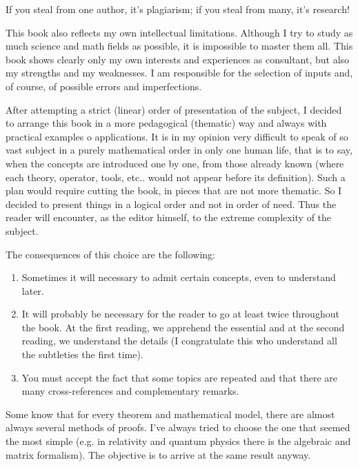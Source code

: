 	\begin{fquote}If you steal from one author, it's plagiarism; if you steal from many, it's research!
 	\end{fquote}

	This book also reflects my own intellectual limitations. Although I try to study as much science and math fields as possible, it is impossible to master them all. This book shows clearly only my own interests and experiences as consultant, but also my strengths and my weaknesses. I am responsible for the selection of inputs and, of course, of possible errors and imperfections.

	After attempting a strict (linear) order of presentation of the subject, I decided to arrange this book in a more pedagogical (thematic) way and always with practical examples o applications. It is in my opinion very difficult to speak of so vast subject in a purely mathematical order in only one human life, that is to say, when the concepts are introduced one by one, from those already known (where each theory, operator, tools, etc.. would not appear before its definition). Such a plan would require cutting the book, in pieces that are not more thematic. So I decided to present things in a logical order and not in order of need. Thus the reader will encounter, as the editor himself, to the extreme complexity of the subject.

	The consequences of this choice are the following:
	\begin{enumerate}
		\item Sometimes it will necessary to admit certain concepts, even to understand later.
	
		\item It will probably be necessary for the reader to go at least twice throughout the book. At the first reading, we apprehend the essential and at the second reading, we understand the details (I congratulate this who understand all the subtleties the first time).
	
		\item You must accept the fact that some topics are repeated and that there are many cross-references and complementary remarks.
	\end{enumerate} 
	
	Some know that for every theorem and mathematical model, there are almost always several methods of proofs. I've always tried to choose the one that seemed the most simple (e.g. in relativity and quantum physics there is the algebraic and matrix formalism). The objective is to arrive at the same result anyway.
	

